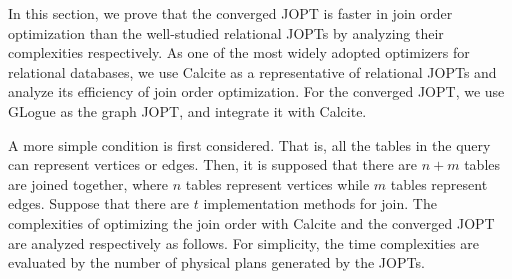 \documentclass[sigconf, nonacm]{acmart}
\begin{document}
In this section, we prove that the converged JOPT is faster in join order optimization than the well-studied relational JOPTs by analyzing their complexities respectively.
As one of the most widely adopted optimizers for relational databases, we use Calcite \cite{calcite,columbia} as a representative of relational JOPTs and analyze its efficiency of join order optimization.
For the converged JOPT, we use GLogue \cite{GLogS} as the graph JOPT, and integrate it with Calcite.

A more simple condition is first considered.
That is, all the tables in the query can represent vertices or edges.
Then, it is supposed that there are $n + m$ tables are joined together, where $n$ tables represent vertices while $m$ tables represent edges.
Suppose that there are $t$ implementation methods for join.
The complexities of optimizing the join order with Calcite and the converged JOPT are analyzed respectively as follows.
For simplicity, the time complexities are evaluated by the number of physical plans generated by the JOPTs.
\end{document}
